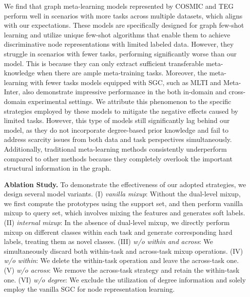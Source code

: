 We find that graph meta-learning models represented by COSMIC and TEG perform well in scenarios with more tasks across multiple datasets, which aligns with our expectations. These models are specifically designed for graph few-shot learning and utilize unique few-shot algorithms that enable them to achieve discriminative node representations with limited labeled data. However, they struggle in scenarios with fewer tasks, performing significantly worse than our model. This is because they can only extract sufficient transferable meta-knowledge when there are ample meta-training tasks. 
Moreover, the meta-learning with fewer tasks models equipped with SGC, such as MLTI and Meta-Inter, also demonstrate impressive performance in the both in-domain and cross-domain experimental settings. We attribute this phenomenon to the specific strategies employed by these models to mitigate the negative effects caused by limited tasks. However, this type of models still significantly lag behind our model, as they do not incorporate degree-based prior knowledge and fail to address scarcity issues from both data and task perspectives simultaneously. Additionally, traditional meta-learning methods consistently underperform compared to other methods because they completely overlook the important structural information in the graph.


\noindent \textbf{Ablation Study.} 
To demonstrate the effectiveness of our adopted strategies, we design several model variants. (I) \textit{vanilla mixup}: Without the dual-level mixup, we first compute the prototypes using the support set, and then perform vanilla mixup to query set, which involves mixing the features and generates soft labels. (II) \textit{internal mixup}: In the absence of dual-level mixup, we directly perform mixup on different classes within each task and generate corresponding hard labels, treating them as novel classes. %
(III) \textit{w/o within and across}: We simultaneously discard both within-task and across-task mixup operations. (IV) \textit{w/o within}: We delete the within-task operation and leave the across-task one. (V) \textit{w/o across}: We remove the across-task strategy and retain the within-task one. (VI) \textit{w/o degree}: We exclude the utilization of degree information and solely employ the vanilla SGC for node representation learning.

